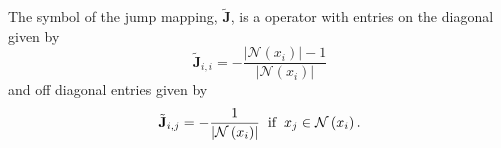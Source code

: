 \begin{definition}
The symbol of the jump mapping, $\tilde{\mathbf{J}}$, is a operator with entries on the diagonal given by
\begin{equation}
\tilde{\mathbf{J}}_{i, i} = - \frac{\lvert \mathcal{N} \left( x_i \right) \rvert - 1}{\lvert \mathcal{N} \left( x_i \right) \rvert}
\end{equation}
and off diagonal entries given by
\begin{equation}
\tilde{\mathbf{J}}_{i, j} = - \frac{1}{\lvert \mathcal{N} \left( x_i \right) \rvert} \hspace{2mm} \text{if} \hspace{2mm} x_j \in \mathcal{N} \left( x_i \right).
\end{equation}
\label{def:harmonic_injection_symbol}
\end{definition}
